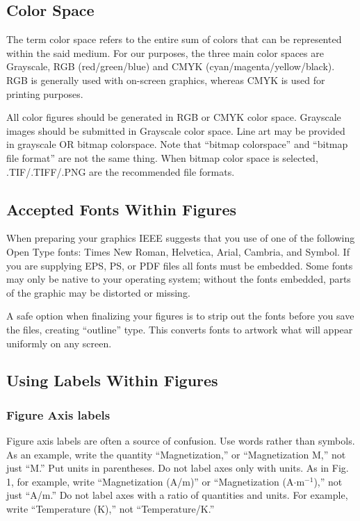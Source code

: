 \documentclass{ieeeaccess}
\begin{document}
\subsection{Color Space}
The term color space refers to the entire sum of colors that can be
represented within the said medium. For our purposes, the three main color
spaces are Grayscale, RGB (red/green/blue) and CMYK
(cyan/magenta/yellow/black). RGB is generally used with on-screen graphics,
whereas CMYK is used for printing purposes.

All color figures should be generated in RGB or CMYK color space. Grayscale
images should be submitted in Grayscale color space. Line art may be
provided in grayscale OR bitmap colorspace. Note that ``bitmap colorspace''
and ``bitmap file format'' are not the same thing. When bitmap color space
is selected, .TIF/.TIFF/.PNG are the recommended file formats.

\subsection{Accepted Fonts Within Figures}
When preparing your graphics IEEE suggests that you use of one of the
following Open Type fonts: Times New Roman, Helvetica, Arial, Cambria, and
Symbol. If you are supplying EPS, PS, or PDF files all fonts must be
embedded. Some fonts may only be native to your operating system; without
the fonts embedded, parts of the graphic may be distorted or missing.

A safe option when finalizing your figures is to strip out the fonts before
you save the files, creating ``outline'' type. This converts fonts to
artwork what will appear uniformly on any screen.

\subsection{Using Labels Within Figures}

\subsubsection{Figure Axis labels }
Figure axis labels are often a source of confusion. Use words rather than
symbols. As an example, write the quantity ``Magnetization,'' or
``Magnetization M,'' not just ``M.'' Put units in parentheses. Do not label
axes only with units. As in Fig. 1, for example, write ``Magnetization
(A/m)'' or ``Magnetization (A$\cdot$m$^{-1}$),'' not just ``A/m.'' Do not label axes with a ratio of quantities and
units. For example, write ``Temperature (K),'' not ``Temperature/K.''
\end{document}
